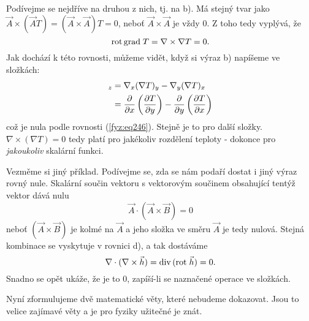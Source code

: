     Podívejme se nejdříve na druhou z nich, tj. na b). Má stejný tvar jako 
    $\vec{A}\times(\vec{A}T)= (\vec{A}\times\vec{A})T = 0$, neboť $\vec{A}\times\vec{A}$ je 
    vždy \(0\). Z toho tedy vyplývá, že
    \begin{equation}\label{fyz:eq239}
      \mathrm{rot}\,\mathrm{grad\;}T = \nabla\times\nabla T = 0.
    \end{equation}
    Jak dochází k této rovnosti, můžeme vidět, když si výraz b) napíšeme ve složkách: 
    \begin{align*}
      [\nabla\times(\nabla T)]_z 
          &= \nabla_x(\nabla T)_y-\nabla_y(\nabla T)_x                                   \\
          &= \pder{}{x}\left(\pder{T}{y}\right) - \pder{}{y}\left(\pder{T}{x}\right)
    \end{align*}
    což je nula podle rovnosti (\ref{fyz:eq246}). Stejně je to pro další složky.
    \(\nabla\times(\nabla T)=0\) tedy platí pro jakékoliv rozdělení teploty - dokonce pro 
    \emph{jakoukoliv} skalární funkci.
  
    Vezměme si jiný příklad. Podívejme se, zda se nám podaří dostat i jiný výraz rovný nule. 
    Skalární součin vektoru s vektorovým součinem obsahující tentýž vektor dává nulu
    \begin{equation*}
      \vec{A}\cdot(\vec{A}\times\vec{B}) = 0
    \end{equation*}
    neboť \((\vec{A}\times\vec{B})\) je kolmé na \(\vec{A}\) a jeho složka ve směru \(\vec{A}\) je 
    tedy nulová. Stejná kombinace se vyskytuje v rovnici d), a tak dostáváme
    \begin{equation}\label{fyz:eq686}
      \nabla\cdot(\nabla\times\vec{h}) = \mathrm{div}\,(\mathrm{rot}\;\vec{h})= 0.
    \end{equation}
    Snadno se opět ukáže, že je to \(0\), zapíší-li se naznačené operace ve složkách.
  
    Nyní zformulujeme dvě matematické věty, které nebudeme dokazovat. Jsou to velice zajímavé věty 
    a je pro fyziky užitečné je znát. 
  

